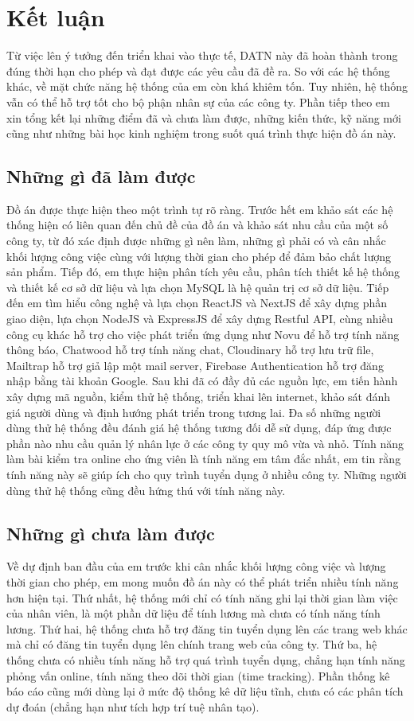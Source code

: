 \documentclass[../DoAn.tex]{subfiles}
\begin{document}
\section{Kết luận}
Từ việc lên ý tưởng đến triển khai vào thực tế, DATN này đã hoàn thành trong đúng thời hạn cho phép và đạt được các yêu cầu đã đề ra. So với các hệ thống khác, về mặt chức năng hệ thống của em còn khá khiêm tốn. Tuy nhiên, hệ thống vẫn có thể hỗ trợ tốt cho bộ phận nhân sự của các công ty. Phần tiếp theo em xin tổng kết lại những điểm đã và chưa làm được, những kiến thức, kỹ năng mới cũng như những bài học kinh nghiệm trong suốt quá trình thực hiện đồ án này.

\subsection{Những gì đã làm được}
Đồ án được thực hiện theo một trình tự rõ ràng. Trước hết em khảo sát các hệ thống hiện có liên quan đến chủ đề của đồ án và khảo sát nhu cầu của một số công ty, từ đó xác định được những gì nên làm, những gì phải có và cân nhắc khối lượng công việc cùng với lượng thời gian cho phép để đảm bảo chất lượng sản phẩm. Tiếp đó, em thực hiện phân tích yêu cầu, phân tích thiết kế hệ thống và thiết kế cơ sở dữ liệu và lựa chọn MySQL là hệ quản trị cơ sở dữ liệu. Tiếp đến em tìm hiểu công nghệ và lựa chọn ReactJS và NextJS để xây dựng phần giao diện, lựa chọn NodeJS và ExpressJS để xây dựng Restful API, cùng nhiều công cụ khác hỗ trợ cho việc phát triển ứng dụng như Novu để hỗ trợ tính năng thông báo, Chatwood hỗ trợ tính năng chat, Cloudinary hỗ trợ lưu trữ file, Mailtrap hỗ trợ giả lập một mail server, Firebase Authentication hỗ trợ đăng nhập bằng tài khoản Google. Sau khi đã có đầy đủ các nguồn lực, em tiến hành xây dựng mã nguồn, kiểm thử hệ thống, triển khai lên internet, khảo sát đánh giá người dùng và định hướng phát triển trong tương lai. Đa số những người dùng thử hệ thống đều đánh giá hệ thống tương đối dễ sử dụng, đáp ứng được phần nào nhu cầu quản lý nhân lực ở các công ty quy mô vừa và nhỏ. Tính năng làm bài kiểm tra online cho ứng viên là tính năng em tâm đắc nhất, em tin rằng tính năng này sẽ giúp ích cho quy trình tuyển dụng ở nhiều công ty. Những người dùng thử hệ thống cũng đều hứng thú với tính năng này.

\subsection{Những gì chưa làm được}
Về dự định ban đầu của em trước khi cân nhắc khối lượng công việc và lượng thời gian cho phép, em mong muốn đồ án này có thể phát triển nhiều tính năng hơn hiện tại. Thứ nhất, hệ thống mới chỉ có tính năng ghi lại thời gian làm việc của nhân viên, là một phần dữ liệu để tính lương mà chưa có tính năng tính lương. Thứ hai, hệ thống chưa hỗ trợ đăng tin tuyển dụng lên các trang web khác mà chỉ có đăng tin tuyển dụng lên chính trang web của công ty. Thứ ba, hệ thống chưa có nhiều tính năng hỗ trợ quá trình tuyển dụng, chẳng hạn tính năng phỏng vấn online, tính năng theo dõi thời gian (time tracking). Phần thống kê báo cáo cũng mới dùng lại ở mức độ thống kê dữ liệu tĩnh, chưa có các phân tích dự đoán (chẳng hạn như tích hợp trí tuệ nhân tạo).
\end{document}
